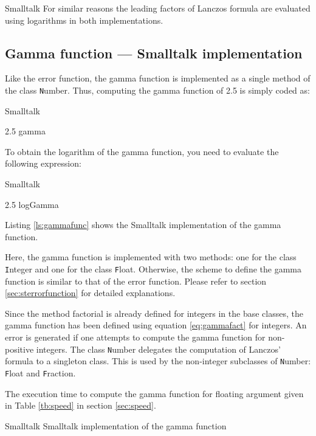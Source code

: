 \begin{listing}{Smalltalk}
For similar reasons the leading factors of Lanczos formula are
evaluated using logarithms in both implementations.

\subsection{Gamma function --- Smalltalk implementation}
 Like the error function, the gamma
function is implemented as a single method of the class {\texttt
Number}. Thus, computing the gamma function of 2.5 is simply coded
as:
\begin{listing}{Smalltalk}

 2.5 gamma
\end{listing}
To obtain the logarithm of the gamma function, you need to
evaluate the following expression:
\begin{listing}{Smalltalk}

 2.5 logGamma
\end{listing}

Listing \ref{ls:gammafunc} shows the Smalltalk implementation of the gamma
function.

Here, the gamma function is implemented with two methods: one for
the class {\texttt Integer} and one for the class {\texttt Float}.
Otherwise, the scheme to define the gamma function is similar to
that of the error function. Please refer to section
\ref{sec:sterrorfunction} for detailed explanations.

Since the method factorial is already defined for integers in the
base classes, the gamma function has been defined using equation
\ref{eq:gammafact} for integers. An error is generated if one
attempts to compute the gamma function for non-positive integers.
The class {\texttt Number} delegates the computation of Lanczos'
formula to a singleton class. This is used by the non-integer
subclasses of {\texttt Number}: {\texttt Float} and {\texttt Fraction}.

The execution time to compute the gamma function for floating
argument given in Table \ref{tb:speed} in section \ref{sec:speed}.
\begin{listing}[label=ls:gammafunc]{Smalltalk}
{Smalltalk implementation of the gamma function}



\end{listing}


\end{listing}
